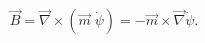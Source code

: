 \begin{equation}
\vec B = \vec\nabla\times(\vec m\; \dot\psi) = 
- \vec m \times \vec \nabla \dot\psi.
\end{equation}

